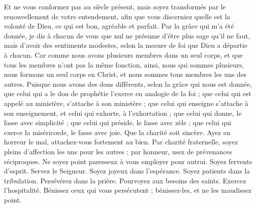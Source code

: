 \begin{multicols}{2}
Et ne vous conformez pas au siècle présent, mais soyez transformés par le renouvellement de votre entendement, afin que vous discerniez quelle est la volonté de Dieu, ce qui est bon, agréable et parfait.
Par la grâce qui m’a été donnée, je dis à chacun de vous que nul ne présume d'être plus sage qu'il ne faut, mais d’avoir des sentiments modestes, selon la mesure de foi que Dieu a départie à chacun.
Car comme nous avons plusieurs membres dans un seul corps, et que tous les membres n'ont pas la même fonction,
ainsi, nous qui sommes plusieurs, nous formons un seul corps en Christ, et nous sommes tous membres les uns des autres.
Puisque nous avons des dons différents, selon la grâce qui nous est donnée, que celui qui a le don de prophétie l’exerce en analogie de la foi ;
que celui qui est appelé au ministère, s’attache à son ministère ; que celui qui enseigne s’attache à son enseignement,
et celui qui exhorte, à l’exhortation ; que celui qui donne, le fasse avec simplicité ; que celui qui préside, le fasse avec zèle ; que celui qui exerce la miséricorde, le fasse avec joie.
Que la charité soit sincère. Ayez en horreur le mal, attachez-vous fortement au bien.
Par charité fraternelle, soyez pleins d’affection les uns pour les autres ; par honneur, usez de prévenances réciproques.
Ne soyez point paresseux à vous employer pour autrui. Soyez fervents d'esprit. Servez le Seigneur.
Soyez joyeux dans l'espérance. Soyez patients dans la tribulation. Persévérez dans la prière.
Pourvoyez aux besoins des saints. Exercez l'hospitalité.
Bénissez ceux qui vous persécutent ; bénissez-les, et ne les maudissez point.

\end{multicols}
